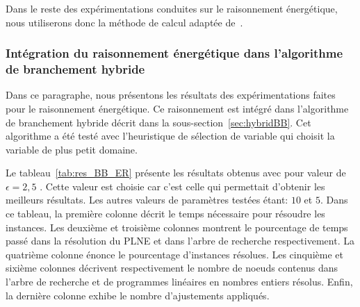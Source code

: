 Dans le reste des expérimentations conduites sur le raisonnement
énergétique, nous utiliserons donc la méthode de calcul adaptée de~\cite{DP}. 

\subsubsection{Intégration du raisonnement énergétique dans
  l'algorithme de branchement hybride}

Dans ce paragraphe, nous présentons les résultats des expérimentations
faites pour le raisonnement énergétique. Ce raisonnement est intégré
dans l'algorithme de branchement hybride décrit dans la
sous-section~\ref{sec:hybridBB}. Cet algorithme a été testé avec 
l'heuristique de sélection de variable qui choisit la variable de plus
petit domaine.

Le tableau~\ref{tab:res_BB_ER} présente les résultats obtenus avec 
pour valeur de $\epsilon=2,5$ . Cette valeur est choisie car c'est celle
qui permettait d'obtenir les meilleurs résultats. Les autres valeurs
de paramètres testées étant: $10$ et $5$. Dans ce tableau, la première
colonne décrit le temps nécessaire pour résoudre les instances. Les
deuxième et troisième colonnes montrent le pourcentage de temps passé
dans la résolution du PLNE et dans l'arbre de recherche
respectivement. La quatrième colonne énonce le pourcentage d'instances
résolues. Les cinquième et sixième colonnes décrivent respectivement
le nombre de noeuds contenus dans l'arbre de recherche et de
programmes linéaires en nombres entiers résolus. Enfin, la dernière
colonne exhibe le nombre d'ajustements appliqués.

